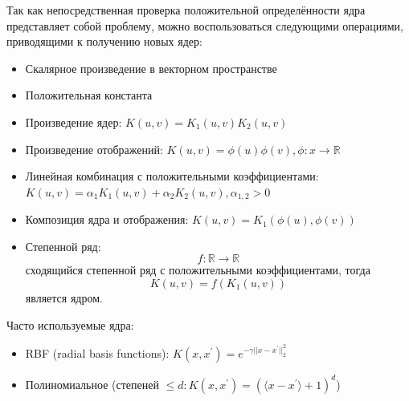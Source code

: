 \documentclass[11pt, oneside]{article}   	%
\begin{document}
	Так как непосредственная проверка положительной определённости ядра представляет собой проблему, можно воспользоваться следующими операциями, приводящими к получению новых ядер:
	
	\begin{itemize}
		\item Скалярное произведение в векторном пространстве
		\item Положительная константа
		\item Произведение ядер: $K(u, v) = K_1(u, v) K_2(u, v)$
		\item Произведение отображений: $K(u, v) = \phi(u)\phi(v), \phi: x \rightarrow \mathbb{R}$
		\item Линейная комбинация с положительными коэффициентами: $K(u, v) = \alpha_1 K_1(u, v) + \alpha_2 K_2(u, v), \alpha_{1,2} > 0$
		\item Композиция ядра и отображения: $K(u, v) =  K_1(\phi(u), \phi(v))$
		\item Степенной ряд: $$ f: \mathbb{R} \rightarrow \mathbb{R}$$ сходящийся степенной ряд с положительными коэффициентами, тогда $$ K(u, v) = f(K_1(u, v)) $$ является ядром.
	\end{itemize} 
	
	
	Часто используемые ядра:
	\begin{itemize}
		\item RBF (radial basis functions): $K(x, x^{'}) = e^{-\gamma ||x - x^{'}||_2^2}$
		\item Полиномиальное (степеней $\leqslant d : K(x, x^{'}) = (\langle x - x^{'} \rangle + 1)^d$)
	\end{itemize} 

	
\end{document}
